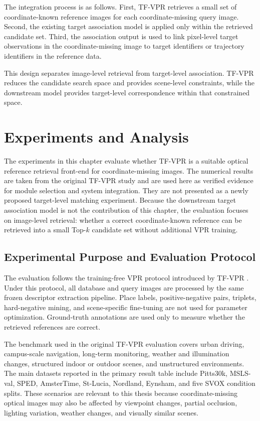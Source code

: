 The integration process is as follows. First, TF-VPR retrieves a small set of coordinate-known reference images for each coordinate-missing query image. Second, the existing target association model is applied only within the retrieved candidate set. Third, the association output is used to link pixel-level target observations in the coordinate-missing image to target identifiers or trajectory identifiers in the reference data.

This design separates image-level retrieval from target-level association. TF-VPR reduces the candidate search space and provides scene-level constraints, while the downstream model provides target-level correspondence within that constrained space.

\section{Experiments and Analysis}
The experiments in this chapter evaluate whether TF-VPR is a suitable optical reference retrieval front-end for coordinate-missing images. The numerical results are taken from the original TF-VPR study and are used here as verified evidence for module selection and system integration. They are not presented as a newly proposed target-level matching experiment. Because the downstream target association model is not the contribution of this chapter, the evaluation focuses on image-level retrieval: whether a correct coordinate-known reference can be retrieved into a small Top-\(k\) candidate set without additional VPR training.

\subsection{Experimental Purpose and Evaluation Protocol}
The evaluation follows the training-free VPR protocol introduced by TF-VPR \cite{wang2026tfvpr}. Under this protocol, all database and query images are processed by the same frozen descriptor extraction pipeline. Place labels, positive-negative pairs, triplets, hard-negative mining, and scene-specific fine-tuning are not used for parameter optimization. Ground-truth annotations are used only to measure whether the retrieved references are correct.

The benchmark used in the original TF-VPR evaluation covers urban driving, campus-scale navigation, long-term monitoring, weather and illumination changes, structured indoor or outdoor scenes, and unstructured environments. The main datasets reported in the primary result table include Pitts30k, MSLS-val, SPED, AmsterTime, St-Lucia, Nordland, Eynsham, and five SVOX condition splits. These scenarios are relevant to this thesis because coordinate-missing optical images may also be affected by viewpoint changes, partial occlusion, lighting variation, weather changes, and visually similar scenes.


